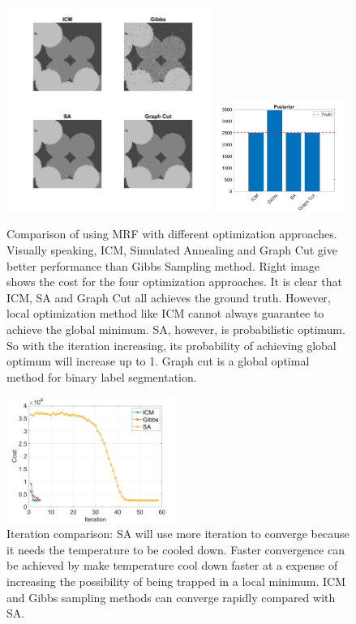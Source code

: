 \documentclass[a4paper]{article}
\begin{document}
	\begin{figure}[htbp]
	\centering
	\includegraphics[width=0.6\textwidth]{./figures/cmp1.png}
	\includegraphics[width=0.38\textwidth]{./figures/cmp2.png}
	\caption{Comparison of using MRF with different optimization approaches. Visually speaking, ICM, Simulated Annealing and Graph Cut give better performance than Gibbs Sampling method. Right image shows the cost for the four optimization approaches. It is clear that ICM, SA and Graph Cut all achieves the ground truth. However, local optimization method like ICM cannot always guarantee to achieve the global minimum. SA, however, is probabilistic optimum. So with the iteration increasing, its probability of achieving global optimum will increase up to 1. Graph cut is a global optimal method for binary label segmentation.}
\end{figure}

	\begin{figure}[htbp]
	\centering
	\includegraphics[width=0.5\textwidth]{./figures/cmp.png}
	\caption{Iteration comparison: SA will use more iteration to converge because it needs the temperature to be cooled down. Faster convergence can be achieved by make temperature cool down faster at a expense of increasing the possibility of being trapped in a local minimum. ICM and Gibbs sampling methods can converge rapidly compared with SA.}
\end{figure}
\end{document}
